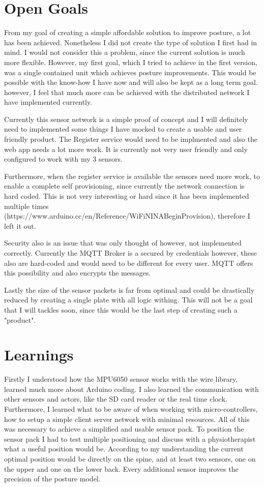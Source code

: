 \section{Open Goals}

From my goal of creating a simple affordable solution to improve posture, a lot has been achieved. Nonetheless I did not create the type of solution I first had in mind. I would not consider this a problem, since the current solution is much more flexible. However, my first goal, which I tried to achieve in the first version, was a single contained unit which achieves posture improvements. This would be possible with the know-how I have now and will also be kept as a long term goal. however, I feel that much more can be achieved with the distributed network I have implemented currently. 

Currently this sensor network is a simple proof of concept and I will definitely need to implemented some things I have mocked to create a usable and user friendly product.  The Register service would need to be implmented and also the web app needs a lot more work. It is currently not very user friendly and only configured to work with my 3 sensors. 

Furthermore, when the register service is available the sensors need more work, to enable a complete self provisioning, since currently the network connection is hard coded. This is not very interesting or hard since it has been implemented multiple times (https://www.arduino.cc/en/Reference/WiFiNINABeginProvision), therefore I left it out. 

Security also is an issue that was only thought of however, not implemented correctly. Currently the MQTT Broker is a secured by credentials however, these also are hard-coded and would need to be different for every user. MQTT offers this possibility and also encrypts the messages.

Lastly the size of the sensor packets is far from optimal and could be drastically reduced by creating a single plate with all logic withing. This will not be a goal that I will tackles soon, since this would be the last step of creating such a "product".


\section{Learnings}

Firstly I understood how the MPU6050 sensor works with the wire library, learned much more about Arduino coding. I also learned the communication with other sensors and actors, like the SD card reader or the real time clock. Furthermore, I learned what to be aware of when working with micro-controllers, how to setup a simple client server network with minimal resources. All of this was necessary to achieve a simplified and usable sensor pack. 
To position the sensor pack I had to test multiple positioning and discuss with a physiotherapist what a useful position would be. According to my understanding the current optimal position would be directly on the spine, and at least two sensors, one on the upper and one on the lower back. Every additional sensor improves the precision of the posture model. 

